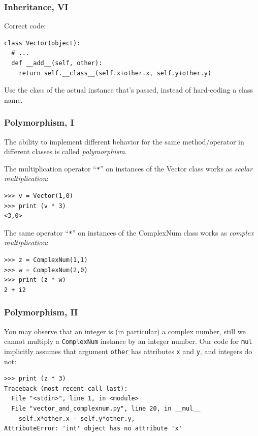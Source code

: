 \begin{frame}[fragile]\frametitle{Inheritance, VI}
  Correct code:
    \begin{lstlisting}
class Vector(object):
  # ...
  def __add__(self, other):
    return self.__class__(self.x+other.x, self.y+other.y)
    \end{lstlisting}
    Use the class of the actual instance that's passed,
    instead of hard-coding a class name.
\end{frame}

\begin{frame}[fragile]\frametitle{Polymorphism, I}

  \small
  The ability to implement different behavior for the same
  method/operator in different classes is called \emph{polymorphism}.

  The multiplication operator ``\texttt{*}'' on instances of the
  Vector class works as \emph{scalar multiplication}:
\begin{lstlisting}
>>> v = Vector(1,0)
>>> print (v * 3)
<3,0>
\end{lstlisting}

  The same operator ``\texttt{*}'' on instances of the
  ComplexNum class works as \emph{complex multiplication}:
\begin{lstlisting}
>>> z = ComplexNum(1,1)
>>> w = ComplexNum(2,0)
>>> print (z * w)
2 + i2
\end{lstlisting}

\end{frame}

\begin{frame}[fragile]\frametitle{Polymorphism, II}

  You may observe that an integer is (in particular) a complex number,
  still we cannot multiply a \texttt{ComplexNum} instance by an
  integer number. Our code for \texttt{mul} implicitly assumes that
  argument \texttt{other} has attributes \texttt{x} and \texttt{y},
  and integers do not:
\begin{lstlisting}
>>> print (z * 3)
Traceback (most recent call last):
  File "<stdin>", line 1, in <module>
  File "vector_and_complexnum.py", line 20, in __mul__
    self.x*other.x - self.y*other.y,
AttributeError: 'int' object has no attribute 'x'
\end{lstlisting}

\end{frame}









